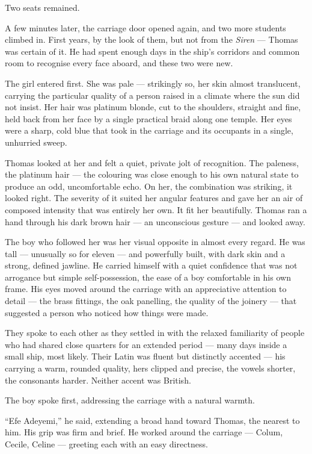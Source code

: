 Two seats remained.
 
A few minutes later, the carriage door opened again, and two more students climbed in. First years, by the look of them, but not from the \textit{Siren} --- Thomas was certain of it. He had spent enough days in the ship's corridors and common room to recognise every face aboard, and these two were new.
 
The girl entered first. She was pale --- strikingly so, her skin almost translucent, carrying the particular quality of a person raised in a climate where the sun did not insist. Her hair was platinum blonde, cut to the shoulders, straight and fine, held back from her face by a single practical braid along one temple. Her eyes were a sharp, cold blue that took in the carriage and its occupants in a single, unhurried sweep.
 
Thomas looked at her and felt a quiet, private jolt of recognition. The paleness, the platinum hair --- the colouring was close enough to his own natural state to produce an odd, uncomfortable echo. On her, the combination was striking, it looked right. The severity of it suited her angular features and gave her an air of composed intensity that was entirely her own. It fit her beautifully. Thomas ran a hand through his dark brown hair --- an unconscious gesture --- and looked away.
 
The boy who followed her was her visual opposite in almost every regard. He was tall --- unusually so for eleven --- and powerfully built, with dark skin and a strong, defined jawline. He carried himself with a quiet confidence that was not arrogance but simple self-possession, the ease of a boy comfortable in his own frame. His eyes moved around the carriage with an appreciative attention to detail --- the brass fittings, the oak panelling, the quality of the joinery --- that suggested a person who noticed how things were made.
 
They spoke to each other as they settled in with the relaxed familiarity of people who had shared close quarters for an extended period --- many days inside a small ship, most likely. Their Latin was fluent but distinctly accented --- his carrying a warm, rounded quality, hers clipped and precise, the vowels shorter, the consonants harder. Neither accent was British.
 
The boy spoke first, addressing the carriage with a natural warmth.
 
\enquote{Efe Adeyemi,} he said, extending a broad hand toward Thomas, the nearest to him. His grip was firm and brief. He worked around the carriage --- Colum, Cecile, Celine --- greeting each with an easy directness.
 
